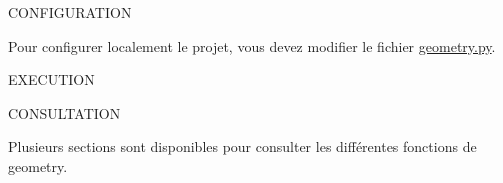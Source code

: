 \label{index_md_README}%
%
 CONFIGURATION

Pour configurer localement le projet, vous devez modifier le fichier \mbox{\hyperlink{geometry_8py}{geometry.\+py}}.

EXECUTION

CONSULTATION

Plusieurs sections sont disponibles pour consulter les différentes fonctions de geometry. 